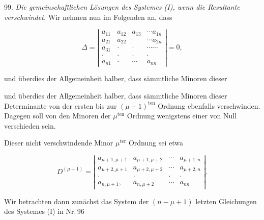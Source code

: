 99. \textit{Die gemeinschaftlichen Lösungen des Systemes (I), wenn die
Resultante verschwindet.} Wir nehmen nun im Folgenden an, dass

\[
\Delta=
\left|
\begin{array}{cccc}
a_{11} & a_{12} & a_{13} & \cdots a_{1n}\\
a_{21} & a_{22} & \cdot & \cdots a_{2n}\\
a_{31} & \cdot & \cdot & \cdots\cdots\\
\cdot & \cdot & \cdot & \cdot\\
a_{n1} & \cdot & \cdots & a_{nn}
\end{array}
\right|=0,
\]

und überdies der Allgemeinheit halber, dass sämmtliche Minoren dieser


und überdies der Allgemeinheit halber, dass sämmtliche Minoren dieser
Determinante von der ersten bis zur $(\mu-1)^{\text{ten}}$ Ordnung
ebenfalls verschwinden. Dagegen soll von den Minoren der
$\mu^{\text{ten}}$ Ordnung wenigstens einer von Null verschieden sein.

Dieser nicht verschwindende Minor $\mu^{\text{ter}}$ Ordnung sei etwa

\[
D^{(\mu+1)}=
\left|
\begin{array}{cccc}
a_{\mu+1,\mu+1} & a_{\mu+1,\mu+2} & \cdots & a_{\mu+1,n}\\
a_{\mu+2,\mu+1} & a_{\mu+2,\mu+2} & \cdots & a_{\mu+2,n}\\
\cdot & \cdot & \cdot & \cdot\\
a_{n,\mu+1}, & a_{n,\mu+2} & \cdots & a_{nn}
\end{array}
\right|.
\]

Wir betrachten dann zunächst das System der $(n-\mu+1)$ letzten
Gleichungen des Systemes (I) in Nr.\,96


